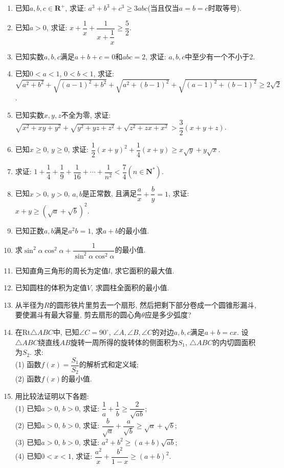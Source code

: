 \documentclass[10pt,a4paper]{article}
\begin{document}
\begin{enumerate}[1.]
\item 已知$a,b,c\in \mathbf{R}^+$, 求证: $a^3+b^3+c^3\ge 3abc$(当且仅当$a=b=c$时取等号).
\item 已知$a>0$, 求证: $x+\dfrac 1x+\dfrac 1{x+\dfrac 1x}\ge \dfrac 52$.
\item 已知实数$a,b,c$满足$a+b+c=0$和$abc=2$, 求证: $a,b,c$中至少有一个不小于2.
\item 已知$0<a<1$, $0<b<1$, 求证: $\sqrt{a^2+b^2}+\sqrt{(a-1)^2+b^2}+\sqrt{a^2+(b-1)^2}+\sqrt{(a-1)^2+(b-1)^2}\ge 2\sqrt 2$.
\item 已知实数$x,y,z$不全为零, 求证: $\sqrt{x^2+xy+y^2}+\sqrt{y^2+yz+z^2}+\sqrt{z^2+zx+x^2}>\dfrac 32(x+y+z)$.
\item 已知$x\ge 0$, $y\ge 0$, 求证: $\dfrac 12(x+y)^2+\dfrac 14(x+y)\ge x\sqrt y+y\sqrt x$.
\item 求证: $1+\dfrac 14+\dfrac 19+\dfrac 1{16}+\cdots +\dfrac 1{n^2}<\dfrac 74(n\in \mathbf{N}^*)$.
\item 已知$x>0$, $y>0$, $a,b$是正常数, 且满足$\dfrac ax+\dfrac by=1$, 求证: $x+y\ge (\sqrt a+\sqrt b)^2$.
\item 已知正数$a,b$满足$a^2b=1$, 求$a+b$的最小值.
\item 求$\sin^2\alpha\cos^2\alpha +\dfrac 1{\sin^2\alpha \cos^2\alpha }$的最小值.
\item 已知直角三角形的周长为定值$l$, 求它面积的最大值.
\item 已知圆柱的体积为定值$V$, 求圆柱全面积的最小值.
\item 从半径为$R$的圆形铁片里剪去一个扇形, 然后把剩下部分卷成一个圆锥形漏斗, 要使漏斗有最大容量, 剪去扇形的圆心角$\theta$应是多少弧度?
\item 在Rt$\triangle ABC$中, 已知$\angle C=90^\circ$, $\angle A,\angle B,\angle C$的对边$a,b,c$满足$a+b=cx$. 设$\triangle ABC$绕直线$AB$旋转一周所得的旋转体的侧面积为$S_1$, $\triangle ABC$的内切圆面积为$S_2$. 求:\\
(1) 函数$f(x)=\dfrac{S_1}{S_2}$的解析式和定义域;\\
(2) 函数$f(x)$的最小值.
\item 用比较法证明以下各题:\\
(1) 已知$a>0$, $b>0$, 求证: $\dfrac 1a+\dfrac 1b\ge \dfrac 2{\sqrt{ab}}$;\\
(2) 已知$a>0$, $b>0$, 求证: $\dfrac b{\sqrt a}+\dfrac a{\sqrt b}\ge \sqrt a+\sqrt b$;\\
(3) 已知$a>0$, $b>0$, 求证: ${a^2}+{b^2}\ge (a+b)\sqrt{ab}$;\\
(4) 已知$0<x<1$, 求证: $\dfrac{a^2}x+\dfrac{b^2}{1-x}\ge (a+b)^2$.

\end{enumerate}
\end{document}
